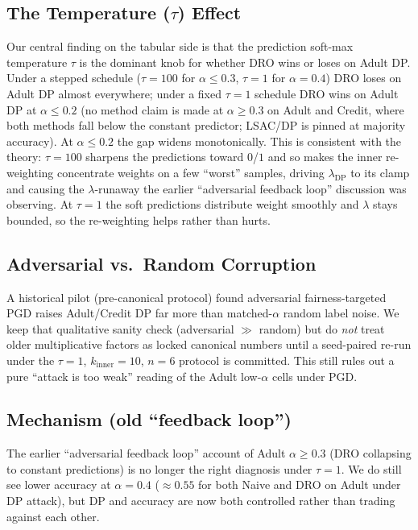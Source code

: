 \subsection{The Temperature ($\tau$) Effect}
\label{sec:tau-discussion}

Our central finding on the tabular side is that the prediction
soft-max temperature $\tau$ is the dominant knob for whether DRO
wins or loses on Adult DP.  Under a stepped schedule
($\tau{=}100$ for $\alpha\le 0.3$, $\tau{=}1$ for $\alpha{=}0.4$)
DRO loses on Adult DP almost everywhere; under a fixed $\tau{=}1$
schedule DRO wins on Adult DP at $\alpha\le0.2$ (no method claim is
made at $\alpha\ge0.3$ on Adult and Credit, where both methods fall
below the constant predictor; LSAC/DP is pinned at majority accuracy).
At $\alpha\le0.2$ the gap widens monotonically.
This is consistent with the theory: $\tau{=}100$
sharpens the predictions toward $0$/$1$ and so makes the inner
re-weighting concentrate weights on a few ``worst'' samples,
driving $\lambda_{\mathrm{DP}}$ to its clamp and causing the
$\lambda$-runaway the earlier ``adversarial feedback loop''
discussion was observing.  At $\tau{=}1$ the soft predictions
distribute weight smoothly and $\lambda$ stays bounded, so the
re-weighting helps rather than hurts.

\subsection{Adversarial vs.\ Random Corruption}
A historical pilot (pre-canonical protocol) found adversarial
fairness-targeted PGD raises Adult/Credit DP far more than matched-$\alpha$
random label noise.  We keep that qualitative sanity check (adversarial
$\gg$ random) but do \emph{not} treat older multiplicative factors as locked
canonical numbers until a seed-paired re-run under the $\tau{=}1$,
$k_{\mathrm{inner}}{=}10$, $n{=}6$ protocol is committed.  This still
rules out a pure ``attack is too weak'' reading of the Adult low-$\alpha$
cells under PGD.

\subsection{Mechanism (old ``feedback loop'')}
The earlier ``adversarial feedback loop'' account of Adult
$\alpha\ge 0.3$ (DRO collapsing to constant predictions) is no
longer the right diagnosis under $\tau{=}1$.  We do still see lower
accuracy at $\alpha{=}0.4$ ($\approx 0.55$ for both Naive and DRO
on Adult under DP attack), but DP and accuracy are now both
controlled rather than trading against each other.

